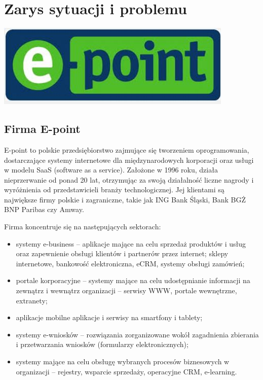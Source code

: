 \documentclass[licencjacka]{pracamgr}
\begin{document}
\chapter{Zarys sytuacji i problemu}

\begin{center}
\includegraphics[scale=0.62]{logo.JPG}
\end{center}

\section{Firma E-point}

E-point to polskie przedsiębiorstwo zajmujące się tworzeniem oprogramowania, dostarczające systemy internetowe dla międzynarodowych korporacji oraz usługi w modelu SaaS (software as a service). Założone w 1996 roku, działa nieprzerwanie od ponad 20 lat, otrzymując za swoją działalność liczne nagrody i wyróżnienia od przedstawicieli branży technologicznej. Jej klientami są największe firmy polskie i zagraniczne, takie jak ING Bank Śląski, Bank BGŻ BNP Paribas czy Amway.

Firma koncentruje się na następujących sektorach:
\begin{itemize}
\item systemy e-business – aplikacje mające na celu sprzedaż produktów i usług oraz zapewnienie obsługi klientów i partnerów przez internet; sklepy internetowe, bankowość elektroniczna, eCRM, systemy obsługi zamówień;
\item  portale korporacyjne – systemy mające na celu udostępnianie informacji na zewnątrz i wewnątrz organizacji – serwisy WWW, portale wewnętrzne, extranety;
\item aplikacje mobilne aplikacje i serwisy na smartfony i tablety;
\item systemy e-wniosków – rozwiązania zorganizowane wokół zagadnienia zbierania i przetwarzania wniosków (formularzy elektronicznych);
\item systemy mające na celu obsługę wybranych procesów biznesowych w organizacji – rejestry, wsparcie sprzedaży, operacyjne CRM, e-learning.
\end{itemize}
\end{document}
